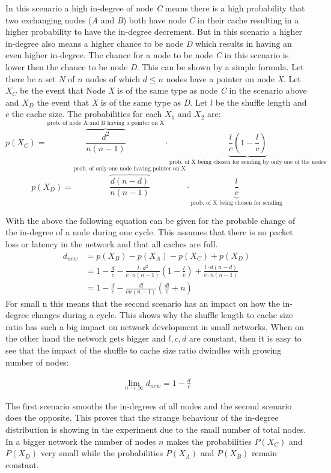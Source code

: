 In this scenario a high in-degree of node \emph{C} means there is a high
probability that two exchanging nodes (\emph{A} and \emph{B}) both have node
\emph{C} in their cache resulting in a higher probability to have the in-degree
decrement. But in this scenario a higher in-degree also means a higher chance to
be node \emph{D} which results in having an even higher in-degree. The chance
for a node to be node \emph{C} in this scenario is lower then the chance to be
node \emph{D}. This can be shown by a simple formula. Let there be a set $N$ of
$n$ nodes of which $d\leq n$ nodes have a pointer on node \emph{X}. Let $X_C$ be
the event that Node \emph{X} is of the same type as node \emph{C} in the
scenario above and $X_D$ the event that \emph{X} is of the same type as
\emph{D}.
Let $l$ be the shuffle length and $c$ the cache size.
The probabilities for each $X_1$ and $X_2$ are:
\[p(X_C) =
\overbrace{\frac{d^2}{n(n-1)}}^{\text{prob. of node A and B having a pointer on
X}} \cdot\underbrace{\frac{l}{c}(1-\frac{l}{c})}_{\text{prob. of X 
being chosen for sending by only one of the nodes}} \]
\[p(X_D) =
\overbrace{\frac{d(n-d)}{n(n-1)}}^{\text{prob. of only one node having
pointer on X}}
\cdot\underbrace{\frac{l}{c}}_{\text{prob. of X being chosen for sending}}\]

With the above the following equation can be given for the probable change of
the in-degree of a node during one cycle. This assumes that there is no packet
loss or latency in the network and that all caches are full.
\begin{align*}
	d_{new} &= p(X_B) - p(X_A) - p(X_C) + p(X_D) \\
	&= 1 - \frac{d}{c} - \frac{l\cdot d^2}{c\cdot n(n-1)}(1-\frac{l}{c}) 
+ \frac{l\cdot d(n-d)}{c\cdot n(n-1)} \\
	&= 1 - \frac{d}{c} - \frac{dl}{cn(n-1)}\left(\frac{dl}{c}+ n \right)
\end{align*}
For small n this means that the second scenario has an impact on how the
in-degree changes during a cycle. This shows why the shuffle length to cache
size ratio has such a big impact on network development in small networks. When
on the other hand the network gets bigger and $l,c,d$ are constant, then it is easy
to see that the impact of the shuffle to cache size ratio dwindles with growing
number of nodes:

\begin{align*}
\lim_{n \to \infty} d_{new} = 1 - \frac{d}{c}
\end{align*}

The first scenario smooths the in-degrees of all nodes and the second
scenario does the opposite. This proves that the strange behaviour of the
in-degree distribution is showing in the experiment due to the small number of
total nodes. In a bigger network the number of nodes $n$ makes the
probabilities $P(X_C)$ and $P(X_D)$ very small while the probabilities $P(X_A)$
and $P(X_B)$ remain constant.

